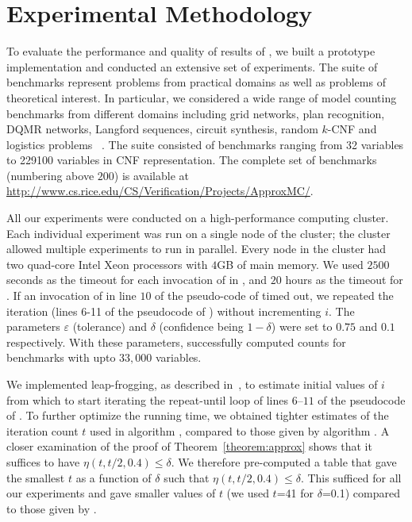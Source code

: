 \section{Experimental Methodology}
\label{sec:experiment}
To evaluate the performance and quality of results of {\ApproxMC}, we
built a prototype implementation and conducted an extensive set of
experiments. The suite of benchmarks represent problems from practical domains as well as problems of theoretical interest. In particular, we considered a wide range of model counting benchmarks
from different domains including grid networks, plan recognition, DQMR networks, Langford sequences, circuit
synthesis, random $k$-CNF and logistics problems ~\cite{SangBearKautz2005,KrocSabSel2008}. The suite consisted of benchmarks ranging from 32 variables to 229100 variables in CNF representation. The complete set of benchmarks (numbering
above $200$) is available at \url{http://www.cs.rice.edu/CS/Verification/Projects/ApproxMC/}.  

All our experiments were conducted on a high-performance computing
cluster.  Each individual experiment was run on a single node of the
cluster; the cluster allowed multiple experiments to run in parallel.
Every node in the cluster had two quad-core Intel Xeon processors with
$4$GB of main memory. We used $2500$ seconds as the timeout for each
invocation of {\BoundedSAT} in {\ApproxMCCore}, and $20$ hours as the
timeout for {\ApproxMC}. If an invocation of {\BoundedSAT} in line
$10$ of the pseudo-code of {\ApproxMCCore} timed out, we repeated the
iteration (lines 6-11 of the pseudocode of {\ApproxMCCore}) without
incrementing $i$. The parameters $\varepsilon$ (tolerance) and
$\delta$ (confidence being $1-\delta$) were set to $0.75$ and $0.1$
respectively.  With these parameters, {\ApproxMC} successfully
computed counts for benchmarks with upto $33,000$ variables.
%
%
%

We implemented leap-frogging, as described in~\cite{SKV13}, to
estimate initial values of $i$ from which to start iterating the
repeat-until loop of lines $6$--$11$ of the pseudocode of
{\ApproxMCCore}.  %
%
%
To further optimize the running time, we obtained tighter estimates of
the iteration count $t$ used in algorithm {\ApproxMC}, compared to
those given by algorithm {\ComputeIterCount}.  A closer examination of
the proof of Theorem~\ref{theorem:approx} shows that it suffices to
have $\eta(t, t/2, 0.4) \le \delta$.  We therefore pre-computed a
table that gave the smallest $t$ as a function of $\delta$ such that
$\eta(t, t/2, 0.4) \le \delta$.  This sufficed for all our experiments
and gave smaller values of $t$ (we used $t$=41 for $\delta$=0.1) compared to those given by
{\ComputeIterCount}.
%
%
%
%
%
%
%
 
